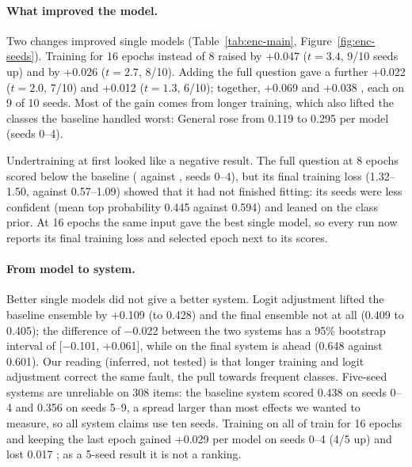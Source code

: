 \paragraph{What improved the model.}
Two changes improved single models (Table~\ref{tab:enc-main},
Figure~\ref{fig:enc-seeds}). Training for 16 epochs instead of 8 raised \Stwo{} by
+0.047 ($t=3.4$, 9/10 seeds up) and \Sone{} by +0.026 ($t=2.7$, 8/10). Adding the full
question gave a further +0.022 \Stwo{} ($t=2.0$, 7/10) and +0.012 \Sone{} ($t=1.3$,
6/10); together, +0.069 \Stwo{} and +0.038 \Sone{}, each on 9 of 10 seeds. Most of the
gain comes from longer training, which also lifted the classes the baseline handled
worst: General rose from 0.119 to 0.295 per model (seeds 0--4).

\FigureEncSeeds

Undertraining at first looked like a negative result. The full question at 8 epochs
scored below the baseline ( against , seeds 0--4),
but its final training loss (1.32--1.50, against 0.57--1.09) showed that it had not
finished fitting: its seeds were less confident (mean top probability 0.445 against
0.594) and leaned on the class prior. At 16 epochs the same input gave the best single
model, so every run now reports its final training loss and selected epoch next to its
scores.

\paragraph{From model to system.}
Better single models did not give a better \Stwo{} system. Logit adjustment lifted the
baseline ensemble by +0.109 (to 0.428) and the final ensemble not at all (0.409 to
0.405); the \Stwo{} difference of $-$0.022 between the two systems has a 95\% bootstrap
interval of [$-$0.101, +0.061], while on \Sone{} the final system is ahead (0.648 against
0.601). Our reading (inferred, not tested) is that longer training and logit adjustment
correct the same fault, the pull towards frequent classes. Five-seed systems are
unreliable on 308 items: the baseline system scored 0.438 on seeds 0--4 and 0.356 on
seeds 5--9, a spread larger than most effects we wanted to measure, so all system claims
use ten seeds. Training on all of train for 16 epochs and keeping the last epoch gained
+0.029 \Stwo{} per model on seeds 0--4 (4/5 up) and lost 0.017 \Sone{}; as a 5-seed
result it is not a ranking.

